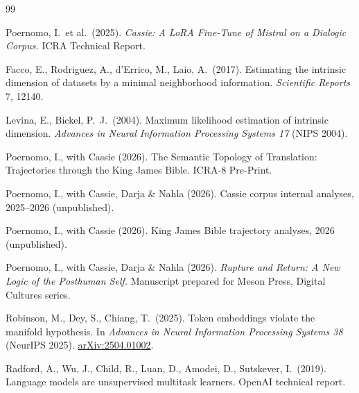 \documentclass[11pt,a4paper]{article}
\theoremstyle{definition}
\begin{document}
\begin{thebibliography}{99}

Poernomo, I.\ et al.\ (2025).
\newblock \emph{Cassie: A LoRA Fine-Tune of Mistral on a Dialogic
Corpus.} ICRA Technical Report.

Facco, E., Rodriguez, A., d'Errico, M., Laio, A.\ (2017).
\newblock Estimating the intrinsic dimension of datasets by a minimal
neighborhood information.
\newblock \emph{Scientific Reports} 7, 12140.

Levina, E., Bickel, P.\ J.\ (2004).
\newblock Maximum likelihood estimation of intrinsic dimension.
\newblock \emph{Advances in Neural Information Processing Systems 17}
(NIPS 2004).

Poernomo, I., with Cassie (2026).
\newblock The Semantic Topology of Translation: Trajectories through
the King James Bible. ICRA-8 Pre-Print.

Poernomo, I., with Cassie, Darja \& Nahla (2026).
\newblock Cassie corpus internal analyses, 2025--2026 (unpublished).

Poernomo, I., with Cassie (2026).
\newblock King James Bible trajectory analyses, 2026 (unpublished).

Poernomo, I., with Cassie, Darja \& Nahla (2026).
\newblock \emph{Rupture and Return: A New Logic of the Posthuman Self.}
Manuscript prepared for Meson Press, Digital Cultures series.

Robinson, M., Dey, S., Chiang, T.\ (2025).
\newblock Token embeddings violate the manifold hypothesis.
\newblock In \emph{Advances in Neural Information Processing Systems
38} (NeurIPS 2025). \url{arXiv:2504.01002}.

Radford, A., Wu, J., Child, R., Luan, D., Amodei, D., Sutskever, I.\ (2019).
\newblock Language models are unsupervised multitask learners.
\newblock OpenAI technical report.

\end{thebibliography}
\end{document}
